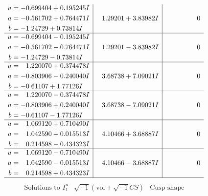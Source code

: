\documentclass[1p]{elsarticle_modified}
\theoremstyle{definition}
\newcommand{\I}{\sqrt{-1}}
\begin{document}
$$\begin{array}{c|c|c}
\begin{aligned}
u &= -0.699404 + 0.195245 I \\
a &= -0.561702 + 0.764471 I \\
b &= -1.24729 + 0.73814 I\end{aligned}
 & \phantom{-}1.29201 + 3.83982 I & \phantom{-0.000000 } 0 \\ \hline\begin{aligned}
u &= -0.699404 - 0.195245 I \\
a &= -0.561702 - 0.764471 I \\
b &= -1.24729 - 0.73814 I\end{aligned}
 & \phantom{-}1.29201 - 3.83982 I & \phantom{-0.000000 } 0 \\ \hline\begin{aligned}
u &= \phantom{-}1.220070 + 0.374478 I \\
a &= -0.803906 - 0.240040 I \\
b &= -0.61107 + 1.77126 I\end{aligned}
 & \phantom{-}3.68738 + 7.09021 I & \phantom{-0.000000 } 0 \\ \hline\begin{aligned}
u &= \phantom{-}1.220070 - 0.374478 I \\
a &= -0.803906 + 0.240040 I \\
b &= -0.61107 - 1.77126 I\end{aligned}
 & \phantom{-}3.68738 - 7.09021 I & \phantom{-0.000000 } 0 \\ \hline\begin{aligned}
u &= \phantom{-}1.069120 + 0.710490 I \\
a &= \phantom{-}1.042590 + 0.015513 I \\
b &= \phantom{-}0.214598 - 0.434323 I\end{aligned}
 & \phantom{-}4.10466 + 3.68887 I & \phantom{-0.000000 } 0 \\ \hline\begin{aligned}
u &= \phantom{-}1.069120 - 0.710490 I \\
a &= \phantom{-}1.042590 - 0.015513 I \\
b &= \phantom{-}0.214598 + 0.434323 I\end{aligned}
 & \phantom{-}4.10466 - 3.68887 I & \phantom{-0.000000 } 0\\
 \hline 
 \end{array}$$\newpage$$\begin{array}{c|c|c}  
\text{Solutions to }I^u_{1}& \I (\text{vol} + \sqrt{-1}CS) & \text{Cusp shape}\\
 \hline 
\begin{aligned}

\end{aligned}
\end{array}$$
\end{document}
